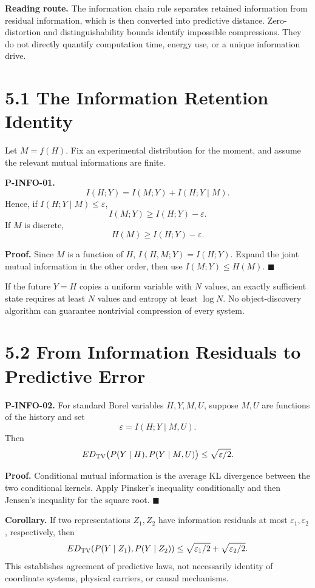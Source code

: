 \documentclass[
  english,
  11pt,
  oneside]{book}
\begin{document}
\textbf{Reading route.} The information chain rule separates retained information from residual information, which is then converted into predictive distance. Zero-distortion and distinguishability bounds identify impossible compressions. They do not directly quantify computation time, energy use, or a unique information drive.

\section{5.1 The Information Retention Identity}\label{the-information-retention-identity}

Let \(M=f(H)\). Fix an experimental distribution for the moment, and assume the relevant mutual informations are finite.

\hypertarget{p-info-01}{}\label{p-info-01}

\textbf{P-INFO-01.} \[I(H;Y)=I(M;Y)+I(H;Y\mid M).\] Hence, if \(I(H;Y\mid M)\le\varepsilon\), \[I(M;Y)\ge I(H;Y)-\varepsilon.\] If \(M\) is discrete, \[H(M)\ge I(H;Y)-\varepsilon.\]

\textbf{Proof.} Since \(M\) is a function of \(H\), \(I(H,M;Y)=I(H;Y)\). Expand the joint mutual information in the other order, then use \(I(M;Y)\le H(M)\). \(\blacksquare\)

If the future \(Y=H\) copies a uniform variable with \(N\) values, an exactly sufficient state requires at least \(N\) values and entropy at least \(\log N\). No object-discovery algorithm can guarantee nontrivial compression of every system.

\section{5.2 From Information Residuals to Predictive Error}\label{from-information-residuals-to-predictive-error}

\hypertarget{p-info-02}{}\label{p-info-02}

\textbf{P-INFO-02.} For standard Borel variables \(H,Y,M,U\), suppose \(M,U\) are functions of the history and set \[\varepsilon=I(H;Y\mid M,U).\] Then \[E D_{\rm TV}\bigl(P(Y\mid H),P(Y\mid M,U)\bigr)
\le\sqrt{\varepsilon/2}.\]

\textbf{Proof.} Conditional mutual information is the average KL divergence between the two conditional kernels. Apply Pinsker's inequality conditionally and then Jensen's inequality for the square root. \(\blacksquare\)

\textbf{Corollary.} If two representations \(Z_1,Z_2\) have information residuals at most \(\varepsilon_1,\varepsilon_2\), respectively, then \[E D_{\rm TV}(P(Y\mid Z_1),P(Y\mid Z_2))
\le\sqrt{\varepsilon_1/2}+\sqrt{\varepsilon_2/2}.\] This establishes agreement of predictive laws, not necessarily identity of coordinate systems, physical carriers, or causal mechanisms.
\end{document}
